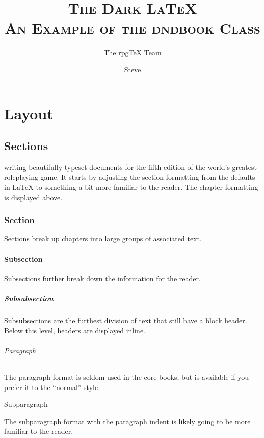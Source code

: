 \documentclass[letterpaper,twocolumn,openany,nodeprecatedcode]{dndbook}
\title{
  \Huge \scshape \fontfamily{pbk}\selectfont
  The Dark \LaTeX{} \\
  \medskip
  \normalfont
  \large
  An Example of the dndbook Class
}
\author{The rpgTeX Team \and Steve}
\date{}
\begin{document}
\frontmatter

\maketitle

\tableofcontents

\mainmatter%

\part{Layout}

\chapter{Sections}

 writing beautifully typeset documents for the fifth edition of the world's greatest roleplaying game. It starts by adjusting the section formatting from the defaults in \LaTeX{} to something a bit more familiar to the reader. The chapter formatting is displayed above.

\section{Section}
Sections break up chapters into large groups of associated text.

\subsection{Subsection}
Subsections further break down the information for the reader.

\subsubsection{Subsubsection}
Subsubsections are the furthest division of text that still have a block header. Below this level, headers are displayed inline.

\paragraph{Paragraph}
The paragraph format is seldom used in the core books, but is available if you prefer it to the ``normal'' style.

\subparagraph{Subparagraph}
The subparagraph format with the paragraph indent is likely going to be more familiar to the reader.
\end{document}
